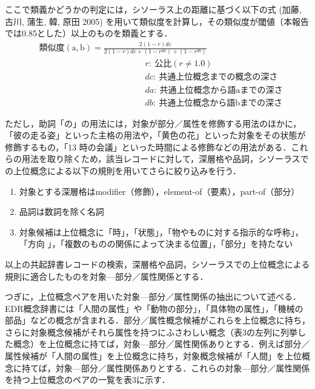 \documentclass[japanese]{jnlp_1.4}
\begin{document}
ここで類義かどうかの判定には，シソーラス上の距離に基づく以下の式 (加藤, 古川, 蒲生, 韓, 原田 2005) を用いて類似度を計算し，その類似度が閾値（本報告では0.85とした）以上のものを類義とする．
\begin{align}
& 類似度(\mathrm{a}, \mathrm{b})=\frac{2(1-r)dc}{2(1-r)dc+(1-r^{da})+(1-r^{db})} \\
& \hspace{150pt}r:\ 公比 (r \ne 1.0) \nonumber\\
& \hspace{150pt}dc:\ 共通上位概念までの概念の深さ\nonumber\\
& \hspace{150pt}da:\ 共通上位概念から語 \mathrm{a} までの深さ\nonumber\\
& \hspace{150pt}db:\ 共通上位概念から語 \mathrm{b} までの深さ\nonumber
\end{align}


ただし，助詞「の」の用法には，対象が部分／属性を修飾する用法のほかに，「彼の走る姿」といった主格の用法や，「黄色の花」といった対象をその状態が修飾するもの，「13 時の会議」といった時間による修飾などの用法がある．これらの用法を取り除くため，該当レコードに対して，深層格や品詞，シソーラスでの上位概念による以下の規則を用いてさらに絞り込みを行う．

\begin{enumerate}
\item 対象とする深層格はmodifier（修飾），element-of（要素），part-of（部分）
\item 品詞は数詞を除く名詞
\item 対象候補は上位概念に「時」，「状態」，「物やものに対する指示的な呼称」，「方向 」，「複数のものの関係によって決まる位置」，「部分」を持たない
\end{enumerate}

以上の共起辞書レコードの検索，深層格や品詞，シソーラスでの上位概念による規則に適合したものを対象—部分／属性関係とする．

つぎに，上位概念ペアを用いた対象—部分／属性関係の抽出について述べる．EDR概念辞書には「人間の属性」や「動物の部分」，「具体物の属性」，「機械の部品」などの概念が含まれる．部分／属性概念候補がこれらを上位概念に持ち，さらに対象概念候補がそれら属性を持つにふさわしい概念（表3の左列に列挙した概念）を上位概念に持てば，対象—部分／属性関係ありとする．例えば部分／属性候補が「人間の属性」を上位概念に持ち，対象概念候補が「人間」を上位概念に持てば，対象—部分／属性関係ありとする．これらの対象—部分／属性関係を持つ上位概念のペアの一覧を表3に示す．
\end{document}
